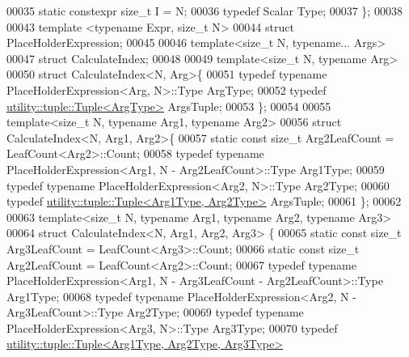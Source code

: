 \begin{DoxyCode}
00035   \textcolor{keyword}{static} constexpr \textcolor{keywordtype}{size\_t} I = N;
00036   \textcolor{keyword}{typedef} Scalar Type;
00037 \};
00038 
00043 \textcolor{keyword}{template} <\textcolor{keyword}{typename} Expr, \textcolor{keywordtype}{size\_t} N>
00044 \textcolor{keyword}{struct }PlaceHolderExpression;
00045 
00046 \textcolor{keyword}{template}<\textcolor{keywordtype}{size\_t} N, \textcolor{keyword}{typename}... Args>
00047 \textcolor{keyword}{struct }CalculateIndex;
00048 
00049 \textcolor{keyword}{template}<\textcolor{keywordtype}{size\_t} N, \textcolor{keyword}{typename} Arg>
00050 \textcolor{keyword}{struct }CalculateIndex<N, Arg>\{
00051   \textcolor{keyword}{typedef} \textcolor{keyword}{typename} PlaceHolderExpression<Arg, N>::Type ArgType;
00052   \textcolor{keyword}{typedef} \hyperlink{structutility_1_1tuple_1_1_tuple}{utility::tuple::Tuple<ArgType>} ArgsTuple;
00053 \};
00054 
00055 \textcolor{keyword}{template}<\textcolor{keywordtype}{size\_t} N, \textcolor{keyword}{typename} Arg1, \textcolor{keyword}{typename} Arg2>
00056 \textcolor{keyword}{struct }CalculateIndex<N, Arg1, Arg2>\{
00057   \textcolor{keyword}{static} \textcolor{keyword}{const} \textcolor{keywordtype}{size\_t} Arg2LeafCount = LeafCount<Arg2>::Count;
00058   \textcolor{keyword}{typedef} \textcolor{keyword}{typename} PlaceHolderExpression<Arg1, N - Arg2LeafCount>::Type Arg1Type;
00059   \textcolor{keyword}{typedef} \textcolor{keyword}{typename} PlaceHolderExpression<Arg2, N>::Type Arg2Type;
00060   \textcolor{keyword}{typedef} \hyperlink{structutility_1_1tuple_1_1_tuple}{utility::tuple::Tuple<Arg1Type, Arg2Type>} ArgsTuple;
00061 \};
00062 
00063 \textcolor{keyword}{template}<\textcolor{keywordtype}{size\_t} N, \textcolor{keyword}{typename} Arg1, \textcolor{keyword}{typename} Arg2, \textcolor{keyword}{typename} Arg3>
00064 \textcolor{keyword}{struct }CalculateIndex<N, Arg1, Arg2, Arg3> \{
00065   \textcolor{keyword}{static} \textcolor{keyword}{const} \textcolor{keywordtype}{size\_t} Arg3LeafCount = LeafCount<Arg3>::Count;
00066   \textcolor{keyword}{static} \textcolor{keyword}{const} \textcolor{keywordtype}{size\_t} Arg2LeafCount = LeafCount<Arg2>::Count;
00067   \textcolor{keyword}{typedef} \textcolor{keyword}{typename} PlaceHolderExpression<Arg1, N - Arg3LeafCount - Arg2LeafCount>::Type Arg1Type;
00068   \textcolor{keyword}{typedef} \textcolor{keyword}{typename} PlaceHolderExpression<Arg2, N - Arg3LeafCount>::Type Arg2Type;
00069   \textcolor{keyword}{typedef} \textcolor{keyword}{typename} PlaceHolderExpression<Arg3, N>::Type Arg3Type;
00070   \textcolor{keyword}{typedef} \hyperlink{structutility_1_1tuple_1_1_tuple}{utility::tuple::Tuple<Arg1Type, Arg2Type, Arg3Type>}

\end{DoxyCode}
